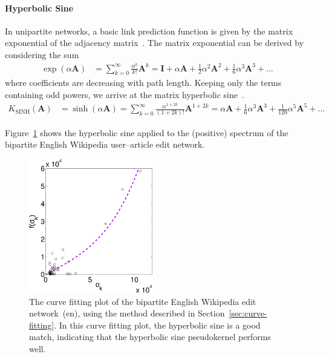 \documentclass[11pt,a4paper]{book}
\newcommand{\wTwo}{0.48}
\begin{document}
\paragraph{Hyperbolic Sine}
In unipartite networks, a basic link prediction function is given by the
matrix exponential of the adjacency matrix~\cite{b137,b244,b263}.  
The matrix exponential can be derived by considering the sum 
\begin{align*}
  \exp(\alpha \mathbf A) &= \sum_{k=0}^\infty \frac {\alpha^k} {k!}
  \mathbf A^k
  = \mathbf I + \alpha\mathbf A + \frac 12 \alpha^2\mathbf A^2 + \frac 16 \alpha^3\mathbf A^3
  + \ldots
\end{align*}
where coefficients are decreasing with path length.  Keeping only the
terms containing odd powers, 
we arrive at the matrix hyperbolic sine~\cite[Chapter~6]{b668}.  
\begin{align}
  K_{\mathrm{SINH}}(\mathbf{A}) &= \sinh(\alpha \mathbf A) =
  \sum_{k=0}^\infty \frac {\alpha^{1+2k}}  {(1+2k)!} \mathbf A^{1+2k} 
  = \alpha\mathbf A + \frac 16 \alpha^3\mathbf A^3 + \frac 1 {120} \alpha^5\mathbf A^5 + \ldots
  \label{eq:matrix-hyperbolic-sine}
\end{align}

Figure~\ref{fig:sinh} shows the hyperbolic sine applied to the
(positive) spectrum of the bipartite English Wikipedia user--article edit
network. 

\begin{figure}[h!]
  \centering
  \includegraphics[width=\wTwo\textwidth]{img-svg/curve.bipf.edit-enwiki.a.sinh}
  \caption{
    The curve fitting plot of the bipartite English Wikipedia edit
    network~(\textsf{en}), using the method described in
    Section~\ref{sec:curve-fitting}. 
    In this curve fitting plot,
    the hyperbolic sine is a good match, indicating that
    the hyperbolic sine pseudokernel performs well.    
  }
  \label{fig:sinh}
\end{figure}
\end{document}
